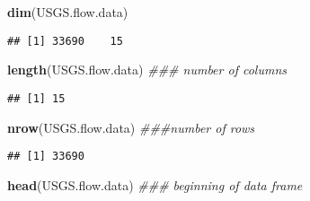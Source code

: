 \documentclass[]{article}
\newenvironment{Shaded}{\begin{snugshade}}{\end{snugshade}}
\newcommand{\CommentTok}[1]{\textcolor[rgb]{0.56,0.35,0.01}{\textit{#1}}}
\newcommand{\KeywordTok}[1]{\textcolor[rgb]{0.13,0.29,0.53}{\textbf{#1}}}
\newcommand{\NormalTok}[1]{#1}
\begin{document}
\begin{Shaded}
\begin{Highlighting}[]
\KeywordTok{dim}\NormalTok{(USGS.flow.data)}
\end{Highlighting}
\end{Shaded}

\begin{verbatim}
## [1] 33690    15
\end{verbatim}

\begin{Shaded}
\begin{Highlighting}[]
\KeywordTok{length}\NormalTok{(USGS.flow.data) }\CommentTok{### number of columns }
\end{Highlighting}
\end{Shaded}

\begin{verbatim}
## [1] 15
\end{verbatim}

\begin{Shaded}
\begin{Highlighting}[]
\KeywordTok{nrow}\NormalTok{(USGS.flow.data) }\CommentTok{###number of rows}
\end{Highlighting}
\end{Shaded}

\begin{verbatim}
## [1] 33690
\end{verbatim}

\begin{Shaded}
\begin{Highlighting}[]
\KeywordTok{head}\NormalTok{(USGS.flow.data) }\CommentTok{### beginning of data frame}
\end{Highlighting}
\end{Shaded}
\end{document}
